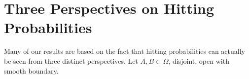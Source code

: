 \documentclass[12pt, nofootinbib,english, amsmath, amssymb, aps, priprint, graphicx,floatfix]{revtex4-1}
\theoremstyle{plain}
\theoremstyle{definition}
\theoremstyle{plain}
\begin{document}
\newpage
\appendix
{}


                                                         
\section{Three Perspectives on Hitting Probabilities}
\label{sec:three_perspectives}

Many of our results are based on the fact that hitting probabilities can actually be seen from three distinct perspectives.  Let $A,B\subset \Omega$, disjoint, open with smooth boundary.  
\end{document}

